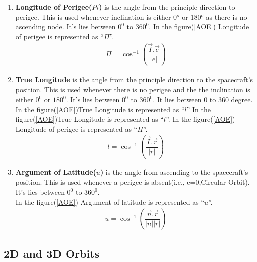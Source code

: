 \begin{enumerate}
\item \textbf{Longitude of Perigee($Pi$)} is the angle from the principle direction to perigee. This is used whenever inclination is either 0$^o$ or 180$^o$ as there is no ascending node. It's lies between $0^0$ to $360^0$. In the figure(\ref{AOE}) Longitude of perigee is represented as \enquote{$\Pi$}.
\begin{align}
\Pi = \cos^{-1}\left(\dfrac{\overrightarrow{I}.\overrightarrow{e}}{|e|}\right)
\end{align}
\item \textbf{True Longitude} is the angle from the principle direction to the spacecraft's position. This is used whenever there is no perigee and the the inclination is either $0^0$ or $180^0$. It's lies between $0^0$ to $360^0$. It lies between 0 to 360 degree. In the figure(\ref{AOE})True Longitude is represented as \enquote{$l$}
In the figure(\ref{AOE})True Longitude is represented as \enquote{$l$}. In the figure(\ref{AOE}) Longitude of perigee is represented as \enquote{$\Pi$}.
\begin{align}
l = \cos^{-1}\left(\dfrac{\overrightarrow{I}.\overrightarrow{r}}{|r|}\right)
\end{align}
\item \textbf{Argument of Latitude($u$)} is the angle from ascending to the spacecraft's position. This is used whenever a perigee is absent(i.e., e=0,Circular Orbit). It's lies between $0^0$ to $360^0$.\\
In the figure(\ref{AOE}) Argument of latitude is represented as \enquote{$u$}.
\begin{align}
u = \cos^{-1}\left(\dfrac{\overrightarrow{n}.\overrightarrow{r}}{|n||r|}\right)
\end{align}
\end{enumerate}
\subsection{2D and 3D Orbits}

